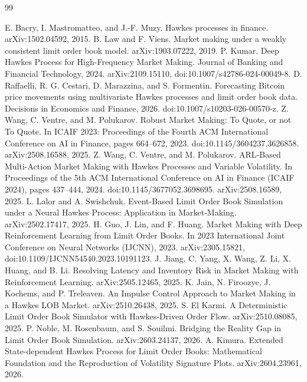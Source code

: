 \documentclass[11pt]{article}
\begin{document}
\begin{thebibliography}{99}
\raggedright
{} E. Bacry, I. Mastromatteo, and J.-F. Muzy. Hawkes
processes in finance. arXiv:1502.04592, 2015.
 B. Law and F. Viens. Market making under a weakly
consistent limit order book model. arXiv:1903.07222, 2019.
 P. Kumar. Deep Hawkes Process for High-Frequency Market
Making. Journal of Banking and Financial Technology, 2024. arXiv:2109.15110,
doi:10.1007/s42786-024-00049-8.
 D. Raffaelli, R. G. Cestari, D. Marazzina, and
S. Formentin. Forecasting Bitcoin price movements using multivariate Hawkes
processes and limit order book data. Decisions in Economics and Finance, 2026.
doi:10.1007/s10203-026-00570-z.
 Z. Wang, C. Ventre, and M. Polukarov. Robust
Market Making: To Quote, or not To Quote. In ICAIF 2023: Proceedings of the
Fourth ACM International Conference on AI in Finance, pages 664--672, 2023.
doi:10.1145/3604237.3626858. arXiv:2508.16588, 2025.
 Z. Wang, C. Ventre, and M. Polukarov. ARL-Based
Multi-Action Market Making with Hawkes Processes and Variable Volatility. In
Proceedings of the 5th ACM International Conference on AI in Finance (ICAIF
2024), pages 437--444, 2024. doi:10.1145/3677052.3698695. arXiv:2508.16589,
2025.
 L. Lalor and A. Swishchuk. Event-Based Limit
Order Book Simulation under a Neural Hawkes Process: Application in
Market-Making. arXiv:2502.17417, 2025.
 H. Guo, J. Lin, and F. Huang. Market Making with Deep
Reinforcement Learning from Limit Order Books. In 2023 International Joint
Conference on Neural Networks (IJCNN), 2023. arXiv:2305.15821,
doi:10.1109/IJCNN54540.2023.10191123.
 J. Jiang, C. Yang, X. Wang, Z. Li, X. Huang, and B. Li.
Resolving Latency and Inventory Risk in Market Making with Reinforcement
Learning. arXiv:2505.12465, 2025.
 K. Jain, N. Firoozye, J. Kochems, and P. Treleaven. An
Impulse Control Approach to Market Making in a Hawkes LOB Market.
arXiv:2510.26438, 2025.
 S. El Karmi. A Deterministic Limit Order Book
Simulator with Hawkes-Driven Order Flow. arXiv:2510.08085, 2025.
 P. Noble, M. Rosenbaum, and S. Souilmi. Bridging the
Reality Gap in Limit Order Book Simulation. arXiv:2603.24137, 2026.
 A. Kimura. Extended State-dependent Hawkes Process for
Limit Order Books: Mathematical Foundation and the Reproduction of Volatility
Signature Plots. arXiv:2604.23961, 2026.

\end{thebibliography}
\end{document}
